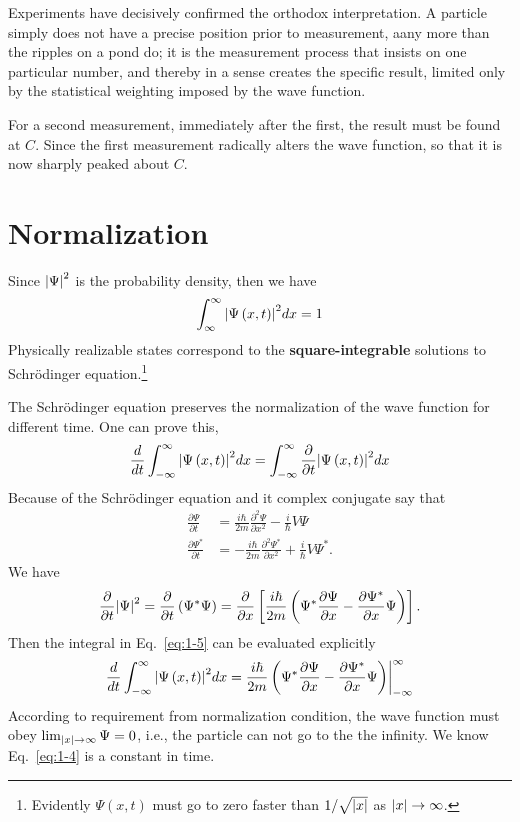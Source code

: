 Experiments have decisively confirmed the orthodox interpretation.
A particle simply does not have a precise position prior to measurement, aany more than the ripples on a pond do; it is the measurement process that insists on one particular number, and thereby in a sense creates the specific result, limited only by the statistical weighting imposed by the wave function.

For a second measurement, immediately after the first, the result must be found at $C$.
Since the first measurement radically alters the wave function, so that it is now sharply peaked about $C$.

\section{Normalization}
Since $\abs{\Psi}^{2}$ is the probability density, then we have
\begin{equation}
  \label{eq:1-4}
  \int_{\infty}^{\infty} \abs{\Psi \left(x,t\right)}^{2}dx = 1
\end{equation}
Physically realizable states correspond to the \textbf{square-integrable} solutions to Schr\"odinger equation.\footnote{Evidently $\Psi \left( x,t \right)$ must go to zero faster than $1/\sqrt{\abs{x}}$ as $\abs{x}\to \infty$.}

The Schr\"odinger equation preserves the normalization of the wave function for different time.
One can prove this,
\begin{equation}
  \label{eq:1-5}
 \frac{d}{dt} \int_{-\infty}^{\infty} \abs{\Psi \left( x,t \right)}^{2} dx = \int_{-\infty}^{\infty} \frac{\partial}{\partial t} \abs{\Psi \left( x,t \right) }^{2} dx
\end{equation}
Because of the Schr\"odinger equation and it complex conjugate say that
\begin{align}
  \label{eq:1-6}
  \frac{\partial \Psi}{\partial t} &=  \frac{i\hbar}{2m} \frac{\partial^{2} \Psi}{\partial x^{2}} - \frac{i}{\hbar} V \Psi \\
  \label{eq:1-7}
  \frac{\partial \Psi^{*}}{\partial t} &=  -\frac{i\hbar}{2m} \frac{\partial^{2} \Psi^{*}}{\partial x^{2}} + \frac{i}{\hbar} V \Psi^{*}.
\end{align}
We have
\begin{equation}
\label{eq:1-8}
\frac{\partial}{\partial t} \abs{\Psi}^{2} = \frac{\partial}{\partial t} \left( \Psi^{*} \Psi \right) = \frac{\partial}{\partial x} \left[ \frac{i\hbar}{2m} \left( \Psi^{*} \frac{\partial \Psi}{\partial x} - \frac{\partial \Psi^{*}}{\partial x} \Psi\right) \right].
\end{equation}
Then the integral in Eq.~\eqref{eq:1-5} can be evaluated explicitly
\begin{equation}
  \label{eq:1-9}
   \frac{d}{dt} \int_{-\infty}^{\infty} \abs{\Psi \left( x,t \right)}^{2} dx = \frac{i \hbar}{2m} \left( \Psi^{*} \frac{\partial \Psi}{\partial x} - \frac{\partial \Psi^{*}}{\partial x} \Psi \right) \biggr\rvert^{\infty}_{-\infty}
\end{equation}
According to requirement from normalization condition, the wave function must obey $\lim_{\abs{x}\to \infty} \Psi = 0$, i.e., the particle can not go to the the infinity.
We know Eq.~\eqref{eq:1-4} is a constant in time.

